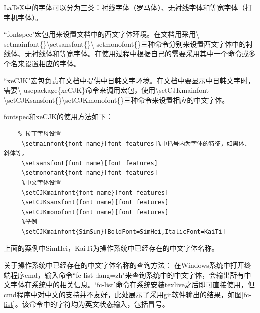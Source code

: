 \documentclass[12pt]{book}
\begin{document}
\LaTeX{}中的字体可以分为三类：衬线字体（罗马体）、无衬线字体和等宽字体（打字机字体）。

``fontspec"宏包用来设置文档中的西文字体环境。在文档用采用\textbackslash
setmainfont\{\}\textbackslash setsansfont\{\}\textbackslash
setmonofont\{\}三种命令分别来设置西文字体中的衬线体、无衬线体和等宽字体。在使用过程中根据自己的需要采用其中一个命令或多个名来设置相应的字体。

``xeCJK"宏包负责在文档中提供中日韩文字环境。在文档中要显示中日韩文字时，需要\textbackslash
usepackage\{xeCJK\}命令来调用宏包，使用\textbackslash setCJKmainfont
\textbackslash setCJKsansfont\{\}\textbackslash setCJKmonofont\{\}三种命令来设置相应的中文字体。

fontspec和xeCJK的使用方法如下：

\begin{verbatim}
    % 拉丁字母设置
     \setmainfont{font name}[font features]%中括号内为字体的特征，如黑体、斜体等。
     \setsansfont{font name}[font features]
     \setmonofant{font name}[font features]
     %中文字体设置
     \setCJKmainfont{font name}[font features]
     \setCJKsansfont{font name}[font features]
     \setCJKmonofont{font name}[font features]
     %举例
     \setCJKmainfont{SimSun}[BoldFont=SimHei,ItalicFont=KaiTi]
\end{verbatim}

上面的案例中SimHei，KaiTi为操作系统中已经存在的中文字体名称。

关于操作系统中已经存在的中文字体名称的查询方法：
在Windows系统中打开终端程序cmd，输入命令``fc-list :lang=zh"来查询系统中的中文字体，会输出所有中文字体在系统中的相关信息。`fc-list'命令在系统安装texlive之后即可直接使用，但cmd程序中对中文的支持并不友好，此处展示了采用git软件输出的结果，如图\ref{fc-list}。该命令中的字符均为英文状态输入，包括冒号。
\end{document}
